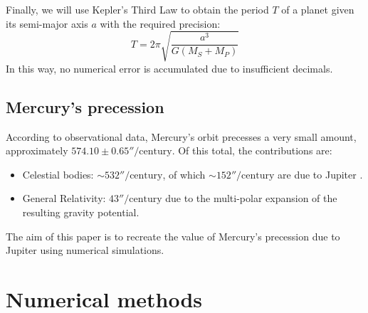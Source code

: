 \documentclass[journal]{IEEEtran}
\begin{document}
Finally, we will use Kepler's Third Law to obtain the period $T$ of a planet given its semi-major axis $a$ with the required precision:
\begin{equation}
    T = 2\pi\sqrt{\frac{a^3}{G(M_S+M_P)}}\label{eq:kepler3}
\end{equation}
In this way, no numerical error is accumulated due to insufficient decimals.

\subsection{Mercury's precession}

According to observational data, Mercury's orbit precesses a very small amount, approximately $574.10\pm0.65''/\text{century}$\cite{wikipedia}. Of this total, the contributions are:
\begin{itemize}
    \item Celestial bodies: $\sim 532''/\text{century}$\cite{wikipedia}, of which $\sim 152''/\text{century}$ are due to Jupiter \cite{precession}.
    \item General Relativity: $43''/\text{century}$ due to the multi-polar expansion of the resulting gravity potential\cite{wikipedia}.
\end{itemize}
The aim of this paper is to recreate the value of Mercury's precession due to Jupiter using numerical simulations.

\section{Numerical methods}\label{sec:precession}
\end{document}
